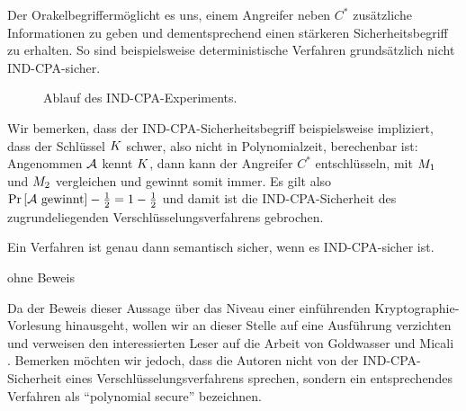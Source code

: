 Der Orakelbegriff\indexOracle ermöglicht es uns, einem Angreifer neben
$C^{\ast}$ zusätzliche Informationen zu geben und dementsprechend einen
stärkeren Sicherheitsbegriff zu erhalten. So sind beispielsweise
deterministische Verfahren grundsätzlich nicht IND-CPA-sicher.
\begin{figure}[h] \centering {}
  \caption{Ablauf des IND-CPA-Experiments.}
  \label{fig:ind-cpa}
\end{figure} Wir bemerken, dass der IND-CPA-Sicherheitsbegriff
beispielsweise impliziert, dass der Schlüssel $K$ schwer, also nicht
in Polynomialzeit, berechenbar ist: Angenommen $\mathcal{A}$ kennt $K$, dann
kann der Angreifer $C^{\ast}$ entschlüsseln, mit $M_1$ und
$M_2$ vergleichen und gewinnt somit immer. Es gilt also $\Pr
\left[ \mathcal{A} \textnormal{ gewinnt} \right] - \frac{1}{2} = 1 - \frac{1}{2}$
und damit ist die IND-CPA-Sicherheit des zugrundeliegenden
Verschlüsselungsverfahrens gebrochen.

\begin{theorem} Ein Verfahren ist genau dann semantisch sicher, wenn es
  IND-CPA-sicher ist.
\end{theorem}
\begin{beweis} ohne Beweis
\end{beweis} Da der Beweis dieser Aussage über das Niveau einer
einführenden Kryptographie-Vorlesung hinausgeht, wollen wir an dieser
Stelle auf eine Ausführung verzichten und verweisen den interessierten
Leser auf die Arbeit von Goldwasser und Micali
\cite{Goldwasser1984}. Bemerken möchten wir jedoch, dass die Autoren
nicht von der IND-CPA-Sicherheit eines Verschlüsselungsverfahrens
sprechen, sondern ein entsprechendes Verfahren als "`polynomial secure"'
bezeichnen.

